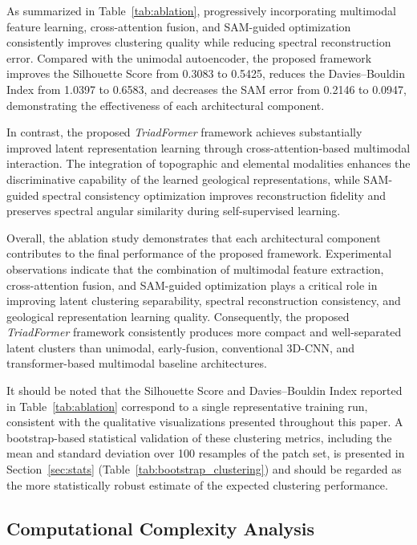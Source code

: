 \documentclass[pdflatex,sn-mathphys-num]{sn-jnl}
\begin{document}
As summarized in Table~\ref{tab:ablation}, progressively incorporating multimodal feature learning, cross-attention fusion, and SAM-guided optimization consistently improves clustering quality while reducing spectral reconstruction error. Compared with the unimodal autoencoder, the proposed framework improves the Silhouette Score from 0.3083 to 0.5425, reduces the Davies--Bouldin Index from 1.0397 to 0.6583, and decreases the SAM error from 0.2146 to 0.0947, demonstrating the effectiveness of each architectural component.

In contrast, the proposed \textit{TriadFormer} framework achieves substantially improved latent representation learning through cross-attention-based multimodal interaction. The integration of topographic and elemental modalities enhances the discriminative capability of the learned geological representations, while SAM-guided spectral consistency optimization improves reconstruction fidelity and preserves spectral angular similarity during self-supervised learning.

Overall, the ablation study demonstrates that each architectural component contributes to the final performance of the proposed framework. Experimental observations indicate that the combination of multimodal feature extraction, cross-attention fusion, and SAM-guided optimization plays a critical role in improving latent clustering separability, spectral reconstruction consistency, and geological representation learning quality. Consequently, the proposed \textit{TriadFormer} framework consistently produces more compact and well-separated latent clusters than unimodal, early-fusion, conventional 3D-CNN, and transformer-based multimodal baseline architectures.

It should be noted that the Silhouette Score and Davies--Bouldin Index reported in Table~\ref{tab:ablation} correspond to a single representative training run, consistent with the qualitative visualizations presented throughout this paper. A bootstrap-based statistical validation of these clustering metrics, including the mean and standard deviation over 100 resamples of the patch set, is presented in Section~\ref{sec:stats} (Table~\ref{tab:bootstrap_clustering}) and should be regarded as the more statistically robust estimate of the expected clustering performance.

\subsection{Computational Complexity Analysis}
\label{sec:complexity}
\end{document}
